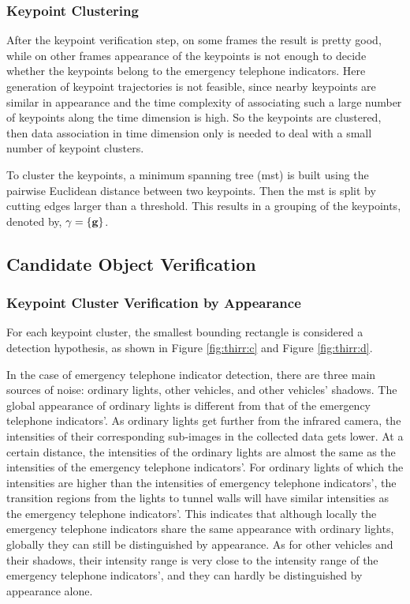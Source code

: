 \subsubsection{Keypoint Clustering}

After the keypoint verification step, on some frames the result is pretty good, while on other frames appearance of the keypoints is not enough to decide whether the keypoints belong to the emergency telephone indicators. Here generation of keypoint trajectories is not feasible, since nearby keypoints are similar in appearance and  the time complexity of associating such a large number of keypoints along the time dimension is high. So the keypoints are clustered, then data association in time dimension only is needed to deal with a small number of keypoint clusters.

To cluster the keypoints, a minimum spanning tree (mst) is built using the pairwise Euclidean distance between two keypoints. Then the mst is split by cutting edges larger than a threshold. This results in a grouping  of the keypoints, denoted by, $\gamma=\{\bf{g}\}$.

\subsection{Candidate Object Verification}

\subsubsection{Keypoint Cluster Verification by Appearance}


For each keypoint cluster, the smallest bounding rectangle is considered a detection hypothesis, as shown in Figure \ref{fig:thirr:c} and Figure \ref{fig:thirr:d}.

In the case of emergency telephone indicator detection, there are three main sources of noise: ordinary lights, other vehicles, and other vehicles' shadows. The global appearance of ordinary lights is different from that of the emergency telephone indicators'. As ordinary lights get further from the infrared camera, the intensities of their corresponding sub-images in the collected data gets lower. At a certain distance, the intensities of the ordinary lights are almost the same as the intensities of the emergency telephone indicators'. For ordinary lights of which the intensities are higher than the intensities of emergency telephone indicators', the transition regions from the lights to tunnel walls will have similar intensities as the emergency telephone indicators'.
This indicates that although locally the emergency telephone indicators share the same appearance with ordinary lights, globally they can still be distinguished by appearance. As for other vehicles and their shadows, their intensity range is very close to the intensity range of the emergency telephone indicators', and they can hardly be distinguished by appearance alone.

